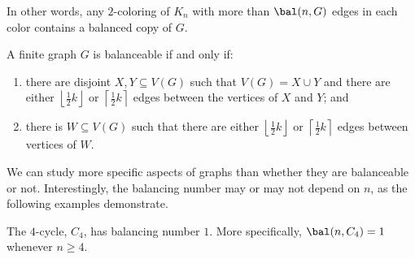 In other words, any $2$-coloring of $K_n$ with more than $\bal(n,G)$ edges in each color contains a balanced copy of $G$.

\begin{theorem}\label{thm:bal_char}
    A finite graph $G$ is balanceable if and only if:
    \begin{enumerate}
        \item there are disjoint $X,Y\subseteq V(G)$ such that $V(G)=X\cup Y$ and there are either $\left\lfloor\frac12k\right\rfloor$ or $\left\lceil\frac12k\right\rceil$ edges between the vertices of $X$ and $Y$; and
        
        \item there is $W\subseteq V(G)$ such that there are either $\left\lfloor\frac12k\right\rfloor$ or $\left\lceil\frac12k\right\rceil$ edges between vertices of $W$.
    \end{enumerate}
\end{theorem}

We can study more specific aspects of graphs than whether they are balanceable or not.
Interestingly, the balancing number may or may not depend on $n$, as the following examples demonstrate.

\begin{proposition}\label{prop:balC_4_is_one}
    The $4$-cycle, $C_4$, has balancing number $1$.
    More specifically, $\bal(n,C_4)=1$ whenever $n\geq4$.
\end{proposition}


